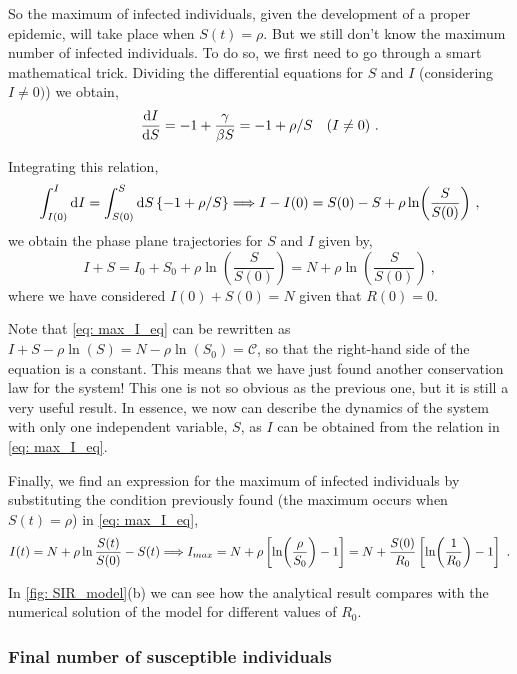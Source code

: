 So the maximum of infected individuals, given the development of a proper
epidemic, will take place when $S(t)=\rho$. But we still don't know the
maximum number of infected individuals. To do so, we first need to go through
a smart mathematical trick. Dividing the differential equations for $S$ and $I$
(considering $I\neq0)$) we obtain,
\begin{equation*}
  \frac{\mathrm{d} I}{\mathrm{d} S}=-1+\frac{\gamma}{\beta S}=-1+\rho/S \quad (I\neq0) \
  .
\end{equation*}

Integrating this relation,
\begin{equation*}
  \int_{I(0)}^{I}\mathrm{d} I=\int_{S(0)}^S\mathrm{d} S \left\{-1 + \rho/S\right\} \Longrightarrow
  I-I(0)=S(0)-S+\rho\ln(\frac{S}{S(0)}) \ ,
\end{equation*}
we obtain the phase plane trajectories for $S$ and $I$ given by,
\begin{equation}\label{eq: max_I_eq}
  I+S=I_0+S_0+\rho\ln(\frac{S}{S(0)})=N+\rho\ln(\frac{S}{S(0)}) \ ,
\end{equation}
where we have considered $I(0)+S(0)=N$ given that $R(0)=0$.

Note that \cref{eq: max_I_eq} can be rewritten as
$I+S-\rho\ln(S)=N-\rho\ln(S_0)=\mathcal{C}$, so that the right-hand side of the
equation is a constant. This means that we have just found another conservation
law for the system! This one is not so obvious as the previous one, but it is
still a very useful result. In essence, we now can describe the dynamics of the
system with only one independent variable, $S$, as $I$ can be obtained from the
relation in \cref{eq: max_I_eq}.

Finally, we find an expression for the maximum of infected individuals by
substituting the condition previously found (the maximum occurs when
$S(t)=\rho$)
in \cref{eq:  max_I_eq},
\begin{equation}
  I(t)=N+\rho\ln{\frac{S(t)}{S(0)}}-S(t) \Longrightarrow
  I_{max}=N+\rho\claudator{\ln(\frac{\rho}{S_0}) -
    1}=N+\frac{S(0)}{R_0}\claudator{\ln(\frac{1}{R_0}) - 1} \ .
\end{equation}

In \cref{fig: SIR_model}(b) we can see how the analytical result compares with
the numerical solution of the model for different values of $R_0$.

\subsubsection*{Final number of susceptible individuals}

